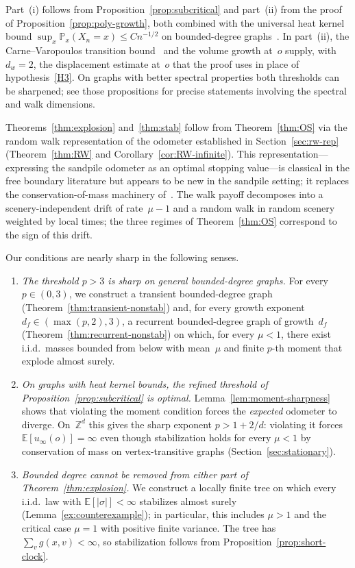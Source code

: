 \documentclass[aop]{imsart}
\theoremstyle{plain}
\theoremstyle{definition}
\newcommand{\Z}{\mathbb{Z}}
\newcommand{\E}{\mathbb{E}}
\renewcommand{\P}{\mathbb{P}}
\begin{document}
	
	Part~(i) follows from Proposition~\ref{prop:subcritical} and part~(ii) from the proof of Proposition~\ref{prop:poly-growth}, both combined with the universal heat kernel bound $\sup_x\P_x(X_n=x)\leq C n^{-1/2}$ on bounded-degree graphs~\citep[Example~5.14]{Grigoryan}. In part~(ii), the Carne--Varopoulos transition bound~\citep[Theorem~13.4]{LP16} and the volume growth at~$o$ supply, with~$d_w=2$, the displacement estimate at~$o$ that the proof uses in place of hypothesis~\ref{H3}. On graphs with better spectral properties both thresholds can be sharpened; see those propositions for precise statements involving the spectral and walk dimensions.
	
	Theorems~\ref{thm:explosion} and~\ref{thm:stab} follow from Theorem~\ref{thm:OS} via the random walk representation of the odometer established in Section~\ref{sec:rw-rep} (Theorem~\ref{thm:RW} and Corollary~\ref{cor:RW-infinite}). This representation---expressing the sandpile odometer as an optimal stopping value---is classical in the free boundary literature \citep{PS06} but appears to be new in the sandpile setting; it replaces the conservation-of-mass machinery of~\citet{div-sand-crit}. The walk payoff decomposes into a scenery-independent drift of rate~$\mu-1$ and a random walk in random scenery weighted by local times; the three regimes of Theorem~\ref{thm:OS} correspond to the sign of this drift.
	
	
	
	Our conditions are nearly sharp in the following senses.
	\begin{enumerate}[label=(\alph*)]
		\item \textit{The threshold $p > 3$ is sharp on general bounded-degree graphs.} For every $p \in (0,3)$, we construct a transient bounded-degree graph (Theorem~\ref{thm:transient-nonstab}) and, for every growth exponent $d_f \in (\max(p,2),3)$, a recurrent bounded-degree graph of growth~$d_f$ (Theorem~\ref{thm:recurrent-nonstab}) on which, for every $\mu < 1$, there exist i.i.d.\ masses bounded from below with mean~$\mu$ and finite $p$-th moment that explode almost surely.
		\item \textit{On graphs with heat kernel bounds, the refined threshold of Proposition~\ref{prop:subcritical} is optimal.} Lemma~\ref{lem:moment-sharpness} shows that violating the moment condition forces the \emph{expected} odometer to diverge. On~$\Z^d$ this gives the sharp exponent $p > 1+2/d$: violating it forces $\E[u_\infty(o)]=\infty$ even though stabilization holds for every $\mu<1$ by conservation of mass on vertex-transitive graphs (Section~\ref{sec:stationary}).
		\item \textit{Bounded degree cannot be removed from either part of Theorem~\ref{thm:explosion}.} We construct a locally finite tree on which every i.i.d.\ law with $\E[|\sigma|]<\infty$ stabilizes almost surely (Lemma~\ref{ex:counterexample}); in particular, this includes $\mu>1$ and the critical case $\mu=1$ with positive finite variance. The tree has $\sum_v g(x,v)<\infty$, so stabilization follows from Proposition~\ref{prop:short-clock}.
	\end{enumerate}
	
\end{document}
